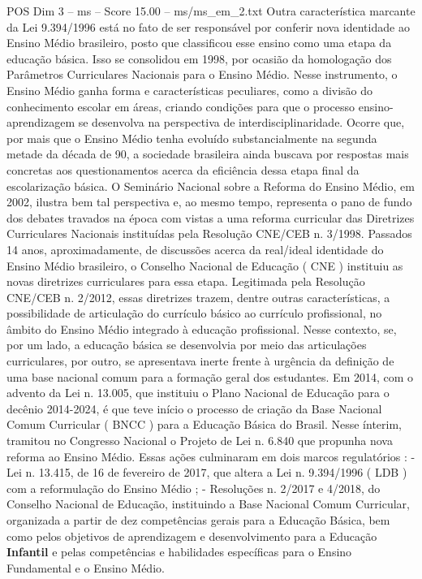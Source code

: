 \begin{textsample}{POS Dim 3 – ms – Score 15.00 – ms/ms\_em\_2.txt}
Outra característica marcante da Lei 9.394/1996 está no fato de ser responsável por conferir nova identidade ao Ensino Médio brasileiro, posto que classificou esse ensino como uma etapa da educação básica.
Isso se consolidou em 1998, por ocasião da homologação dos Parâmetros Curriculares Nacionais para o Ensino Médio.
Nesse instrumento, o Ensino Médio ganha forma e características peculiares, como a divisão do conhecimento escolar em áreas, criando condições para que o processo ensino-aprendizagem se desenvolva na perspectiva de interdisciplinaridade.
Ocorre que, por mais que o Ensino Médio tenha evoluído substancialmente na segunda metade da década de 90, a sociedade brasileira ainda buscava por respostas mais concretas aos questionamentos acerca da eficiência dessa etapa final da escolarização básica.
O Seminário Nacional sobre a Reforma do Ensino Médio, em 2002, ilustra bem tal perspectiva e, ao mesmo tempo, representa o pano de fundo dos debates travados na época com vistas a uma reforma curricular das Diretrizes Curriculares Nacionais instituídas pela Resolução CNE/CEB n. 3/1998.
Passados 14 anos, aproximadamente, de discussões acerca da real/ideal identidade do Ensino Médio brasileiro, o Conselho Nacional de Educação ( CNE ) instituiu as novas diretrizes curriculares para essa etapa.
Legitimada pela Resolução CNE/CEB n. 2/2012, essas diretrizes trazem, dentre outras características, a possibilidade de articulação do currículo básico ao currículo profissional, no âmbito do Ensino Médio integrado à educação profissional.
Nesse contexto, se, por um lado, a educação básica se desenvolvia por meio das articulações curriculares, por outro, se apresentava inerte frente à urgência da definição de uma base nacional comum para a formação geral dos estudantes.
Em 2014, com o advento da Lei n. 13.005, que instituiu o Plano Nacional de Educação para o decênio 2014-2024, é que teve início o processo de criação da Base Nacional Comum Curricular ( BNCC ) para a Educação Básica do Brasil.
Nesse ínterim, tramitou no Congresso Nacional o Projeto de Lei n. 6.840 que propunha nova reforma ao Ensino Médio.
Essas ações culminaram em dois marcos regulatórios : - Lei n. 13.415, de 16 de fevereiro de 2017, que altera a Lei n. 9.394/1996 ( LDB ) com a reformulação do Ensino Médio ; - Resoluções n. 2/2017 e 4/2018, do Conselho Nacional de Educação, instituindo a Base Nacional Comum Curricular, organizada a partir de dez competências gerais para a Educação Básica, bem como pelos objetivos de aprendizagem e desenvolvimento para a Educação \textbf{Infantil} e pelas competências e habilidades específicas para o Ensino Fundamental e o Ensino Médio.

\end{textsample}
